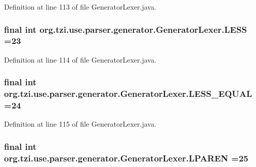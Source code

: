 Definition at line 113 of file Generator\-Lexer.\-java.

\hypertarget{classorg_1_1tzi_1_1use_1_1parser_1_1generator_1_1_generator_lexer_a0edfa656999d7fb899f50d3bf0fff0ed}{
\subsubsection[{L\-E\-S\-S}]{\setlength{\rightskip}{0pt plus 5cm}final int org.\-tzi.\-use.\-parser.\-generator.\-Generator\-Lexer.\-L\-E\-S\-S =23\hspace{0.3cm}{\ttfamily [static]}}}\label{classorg_1_1tzi_1_1use_1_1parser_1_1generator_1_1_generator_lexer_a0edfa656999d7fb899f50d3bf0fff0ed}


Definition at line 114 of file Generator\-Lexer.\-java.

\hypertarget{classorg_1_1tzi_1_1use_1_1parser_1_1generator_1_1_generator_lexer_a0b4a5eef269772561fe1eb88b63c485c}{
\subsubsection[{L\-E\-S\-S\-\_\-\-E\-Q\-U\-A\-L}]{\setlength{\rightskip}{0pt plus 5cm}final int org.\-tzi.\-use.\-parser.\-generator.\-Generator\-Lexer.\-L\-E\-S\-S\-\_\-\-E\-Q\-U\-A\-L =24\hspace{0.3cm}{\ttfamily [static]}}}\label{classorg_1_1tzi_1_1use_1_1parser_1_1generator_1_1_generator_lexer_a0b4a5eef269772561fe1eb88b63c485c}


Definition at line 115 of file Generator\-Lexer.\-java.

\hypertarget{classorg_1_1tzi_1_1use_1_1parser_1_1generator_1_1_generator_lexer_aa7a71163331f0483dd1ea84550af1cff}{
\subsubsection[{L\-P\-A\-R\-E\-N}]{\setlength{\rightskip}{0pt plus 5cm}final int org.\-tzi.\-use.\-parser.\-generator.\-Generator\-Lexer.\-L\-P\-A\-R\-E\-N =25\hspace{0.3cm}{\ttfamily [static]}}}\label{classorg_1_1tzi_1_1use_1_1parser_1_1generator_1_1_generator_lexer_aa7a71163331f0483dd1ea84550af1cff}


